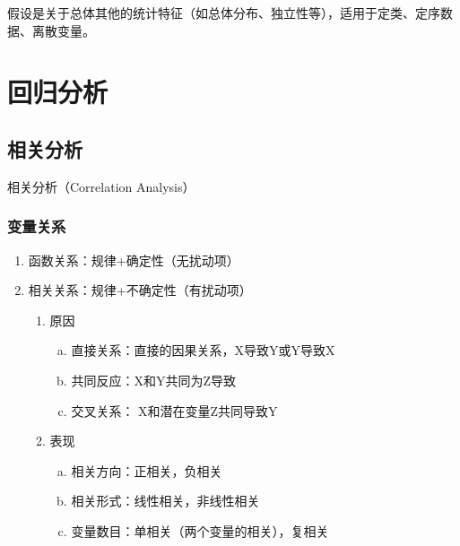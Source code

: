 \documentclass[12pt]{book}
\begin{document}
假设是关于总体其他的统计特征（如总体分布、独立性等），适用于定类、定序数据、离散变量。






\chapter{回归分析}


\section{相关分析}



相关分析（Correlation Analysis）


\subsection{变量关系}

\begin{enumerate}[1.]
    \item 函数关系：规律+确定性（无扰动项）  
    \item 相关关系：规律+不确定性（有扰动项）  
    \begin{enumerate}[(1)]
        \item 原因  
        \begin{enumerate}[a.]
            \item 直接关系：直接的因果关系，X导致Y或Y导致X  
            \item 共同反应：X和Y共同为Z导致  
            \item 交叉关系： X和潜在变量Z共同导致Y  
        \end{enumerate}
        \item 表现  
        \begin{enumerate}[a.]
            \item 相关方向：正相关，负相关   
            \item 相关形式：线性相关，非线性相关  
            \item 变量数目：单相关（两个变量的相关），复相关  
        \end{enumerate}
    \end{enumerate}
\end{enumerate}
\end{document}
